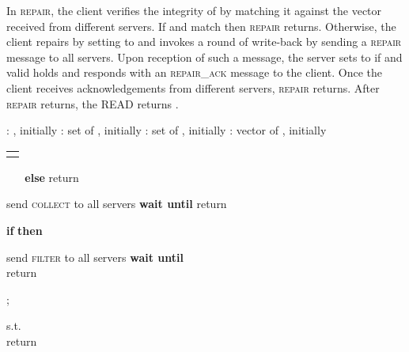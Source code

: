 \documentclass[10pt,conference,compsocconf]{IEEEtran}
\begin{document}
In \textsc{repair}, the client verifies the integrity of  by matching it against the vector  received from  different servers. If  and  match then \textsc{repair} returns. Otherwise, the client repairs  by setting  to  and invokes a round of write-back by sending a \textsc{repair} message to all servers. Upon reception of such a message, the server sets  to  if  and \textsf{valid} holds and responds with an \textsc{repair\_ack} message to the client. Once the client receives acknowledgements from  different servers, \textsc{repair} returns. After \textsc{repair} returns, the \textsc{READ} returns .

\begin{algo}[t]
\small

\begin{distribalgo}[1] \setcounter{ALC@line}{\value{alg:client1:lines}}
\smallskip
{}
\STATE : , initially 
\STATE : set of , initially 
\STATE : set of , initially 
\STATE : vector of , initially 
\ENDINDENT
\setcounter{alg:client1:lines}{\value{ALC@line}}
\end{distribalgo}
\begin{tabular}{c}\hline\mbox{}\hspace{0.45\textwidth}\mbox{}\end{tabular}
\vspace{-2 em}
\begin{distribalgo}[1]   \setcounter{ALC@line}{\value{alg:client1:lines}}
\STATE 
\STATE 
\STATE 
\STATE 
\IF {}
\STATE ~\label{alg2:reader:select}
\STATE  ~\label{alg2:reader:restore}
\STATE 
\ENDIF
\STATE \textbf{else} 
\STATE return 
\ENDINDENT

\smallskip
{}
\STATE send \textsc{collect} to all servers
\STATE \textbf{wait until} 
\STATE return 
\ENDINDENT

\smallskip
{}
\STATE 
\STATE \textbf{if}  \textbf{then} 
\ENDINDENT

\smallskip
{}
\STATE send \textsc{filter} to all servers
\STATE \textbf{wait until} \\ 
\STATE return 
\ENDINDENT

\smallskip
{}
\STATE ; 
\STATE 
\ENDINDENT

\smallskip
{}
\STATE  s.t. \\  \label{alg2:reader:cc}
\STATE  \label{alg2:reader:fr}
\STATE  \label{alg2:reader:decode}
\STATE return 
\ENDINDENT


\end{distribalgo}
\end{algo}
\end{document}
